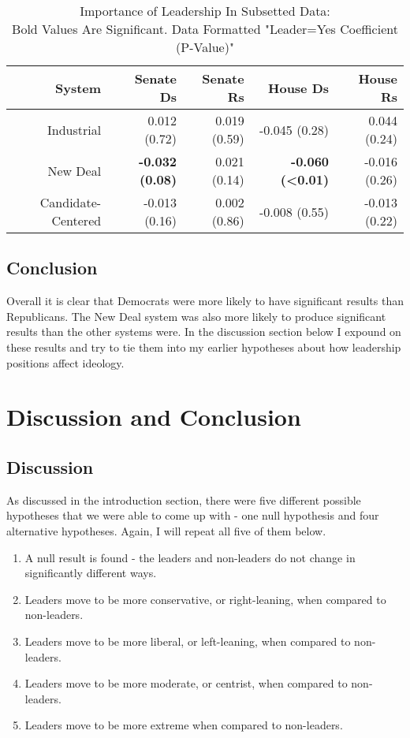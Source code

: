 \documentclass[12pt,twoside]{reedthesis}
\begin{document}
  \begin{table}[h]
  \centering
  \caption[Importance of Leadership In Subsetted Data]{Importance of Leadership In Subsetted Data:\\ Bold Values Are Significant. Data Formatted "Leader=Yes Coefficient (P-Value)"}
  \begin{tabular}{r|rrrr}
  System              & Senate Ds     & Senate Rs    & House Ds      & House Rs      \\ \hline
  Industrial          & 0.012 (0.72)  & 0.019 (0.59) & -0.045 (0.28) & 0.044 (0.24)  \\
  New Deal            & \textbf{-0.032 (0.08)} & 0.021 (0.14) & \textbf{-0.060 (<0.01)} & -0.016 (0.26) \\
  Candidate-Centered  & -0.013 (0.16) & 0.002 (0.86) & -0.008 (0.55) & -0.013 (0.22)
  \end{tabular}
  \end{table}
  
  \section{Conclusion}\label{conclusion}
  
  Overall it is clear that Democrats were more likely to have significant
  results than Republicans. The New Deal system was also more likely to
  produce significant results than the other systems were. In the
  discussion section below I expound on these results and try to tie them
  into my earlier hypotheses about how leadership positions affect
  ideology.
  
  \chapter{Discussion and Conclusion}\label{discussion-and-conclusion}
  
  \section{Discussion}\label{discussion}
  
  As discussed in the introduction section, there were five different
  possible hypotheses that we were able to come up with - one null
  hypothesis and four alternative hypotheses. Again, I will repeat all
  five of them below.
  
  \begin{enumerate}
  \def\labelenumi{\arabic{enumi}.}
  \itemsep1pt\parskip0pt
  \item
    A null result is found - the leaders and non-leaders do not change in
    significantly different ways.
  \item
    Leaders move to be more conservative, or right-leaning, when compared
    to non-leaders.
  \item
    Leaders move to be more liberal, or left-leaning, when compared to
    non-leaders.
  \item
    Leaders move to be more moderate, or centrist, when compared to
    non-leaders.
  \item
    Leaders move to be more extreme when compared to non-leaders.
  \end{enumerate}
  
\end{document}
